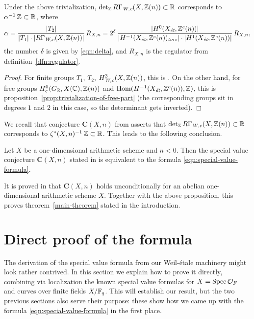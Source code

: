 \documentclass{article}
\numberwithin{equation}{section}
\begin{document}
\begin{proposition}
  Under the above trivialization, $\det_\ZZ R\Gamma_\Wc (X, \ZZ(n)) \subset \RR$
  corresponds to $\alpha^{-1}\,\ZZ \subset \RR$, where
  \[ \alpha = \frac{|T_2|}{|T_1| \cdot |R\Gamma_\Wc (X, \ZZ(n))|}\,R_{X,n}
    = 2^\delta\,\frac{|H^0 (X_\et, \ZZ^c (n))|}{|H^{-1} (X_\et, \ZZ^c(n))_\tors|\cdot |H^1 (X_\et, \ZZ^c(n))|}\,R_{X,n}, \]
  the number $\delta$ is given by \eqref{eqn:delta}, and $R_{X,n}$ is
  the regulator from definition~\ref{dfn:regulator}.

  \begin{proof}
    For finite groups $T_1$, $T_2$, $H^3_\Wc (X, \ZZ(n))$, this is
    \cite[Lemma~A.6]{Beshenov-Weil-etale-2}. On the other hand, for free groups
    $H^0_c (G_\RR, X (\CC), \ZZ(n))$ and
    $\Hom (H^{-1} (X_\et, \ZZ^c (n)), \ZZ)$, this is
    proposition~\ref{prop:trivialization-of-free-part}
    (the corresponding groups sit in degrees $1$ and $2$ in this case, so the
    determinant gets inverted).
  \end{proof}
\end{proposition}

We recall that conjecture $\mathbf{C} (X,n)$ from
\cite[\S 4]{Beshenov-Weil-etale-2} asserts that
$\det_\ZZ R\Gamma_\Wc (X, \ZZ(n)) \subset \RR$ corresponds to
$\zeta^* (X,n)^{-1}\,\ZZ \subset \RR$. This leads to the following conclusion.

\begin{proposition}
  Let $X$ be a one-dimensional arithmetic scheme and $n < 0$. Then the special
  value conjecture $\mathbf{C} (X,n)$ stated in \cite{Beshenov-Weil-etale-2} is
  equivalent to the formula \eqref{eqn:special-value-formula}.
\end{proposition}

It is proved in \cite[\S 7]{Beshenov-Weil-etale-2} that $\mathbf{C} (X,n)$ holds
unconditionally for an abelian one-dimensional arithmetic scheme $X$. Together
with the above proposition, this proves theorem~\ref{main-theorem} stated in the
introduction.


\section{Direct proof of the formula}
\label{sec:demystification}

The derivation of the special value formula from our Weil-étale machinery might
look rather contrived. In this section we explain how to prove it directly,
combining via localization the known special value formulas for
$X = \Spec \mathcal{O}_F$ and curves over finite fields $X/\FF_q$. This will
establish our result, but the two previous sections also serve their purpose:
these show how we came up with the formula \eqref{eqn:special-value-formula}
in the first place.
\end{document}
